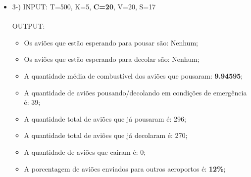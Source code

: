 \documentclass{article}
\begin{document}
\hline

\begin{itemize}
   \item 3-) INPUT: T=500, K=5, \textbf{C=20}, V=20, S=17\\\\
   OUTPUT: 
   \begin{itemize}
      \item Os aviões que estão esperando para pousar são: Nenhum;
      \item Os aviões que estão esperando para decolar são: Nenhum;
      \item A quantidade média de combustível dos aviões que pousaram: \textbf{9.94595};
      \item A quantidade de aviões pousando/decolando em condições de emergência é: 39;
      \item A quantidade total de aviões que já pousaram é: 296;
      \item A quantidade total de aviões que já decolaram é: 270;
      \item A quantidade de aviões que cairam é: 0;
      \item A porcentagem de aviões enviados para outros aeroportos é: \textbf{12\%};
   \end{itemize}
\end{itemize}
\end{document}
